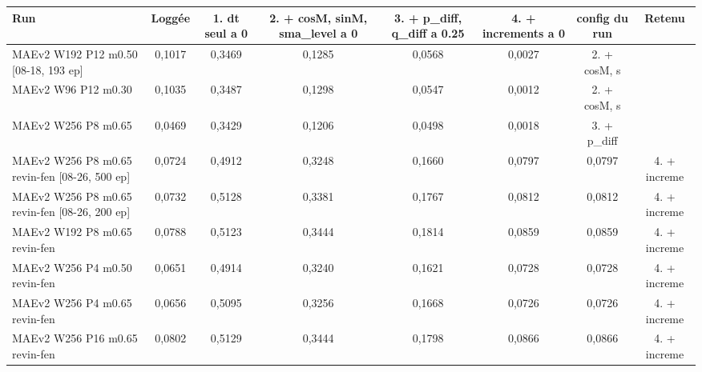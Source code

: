 \begin{tabular}{lccccccc}
\toprule
Run & Loggée & 1. dt seul a 0 & 2. + cosM, sinM, sma\_level a 0 & 3. + p\_diff, q\_diff a 0.25 & 4. + increments a 0 & config du run & Retenu \\
\midrule
MAEv2 W192 P12 m0.50 [08-18, 193 ep] & 0,1017 & 0,3469 & 0,1285 & 0,0568 & 0,0027 & 2. + cosM, s \\
MAEv2 W96 P12 m0.30 & 0,1035 & 0,3487 & 0,1298 & 0,0547 & 0,0012 & 2. + cosM, s \\
MAEv2 W256 P8 m0.65 & 0,0469 & 0,3429 & 0,1206 & 0,0498 & 0,0018 & 3. + p\_diff \\
MAEv2 W256 P8 m0.65 revin-fen [08-26, 500 ep] & 0,0724 & 0,4912 & 0,3248 & 0,1660 & 0,0797 & 0,0797 & 4. + increme \\
MAEv2 W256 P8 m0.65 revin-fen [08-26, 200 ep] & 0,0732 & 0,5128 & 0,3381 & 0,1767 & 0,0812 & 0,0812 & 4. + increme \\
MAEv2 W192 P8 m0.65 revin-fen & 0,0788 & 0,5123 & 0,3444 & 0,1814 & 0,0859 & 0,0859 & 4. + increme \\
MAEv2 W256 P4 m0.50 revin-fen & 0,0651 & 0,4914 & 0,3240 & 0,1621 & 0,0728 & 0,0728 & 4. + increme \\
MAEv2 W256 P4 m0.65 revin-fen & 0,0656 & 0,5095 & 0,3256 & 0,1668 & 0,0726 & 0,0726 & 4. + increme \\
MAEv2 W256 P16 m0.65 revin-fen & 0,0802 & 0,5129 & 0,3444 & 0,1798 & 0,0866 & 0,0866 & 4. + increme \\
\bottomrule
\end{tabular}
